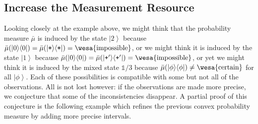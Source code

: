 \documentclass[12pt]{iopart}
\theoremstyle{remark}
\newcommand{\imposs}{{\mbox{\wesa{impossible}}}}
\newcommand{\necess}{{\mbox{\wesa{certain}}}}
\newcommand{\ket}[1]{{\left\vert{#1}\right\rangle}}
\newcommand{\op}[2]{\ensuremath{\left\vert{#1}\middle\rangle\middle\langle{#2}\right\vert}}
\newcommand{\proj}[1]{\op{#1}{#1}}
\newcommand{\ps}{\texttt{+}}
\begin{document}
\subsection{Increase the Measurement Resource}

Looking closely at the example above, we might think that the probability
measure $\bar{\mu}$ is induced by the state $\ket{2}$ because $\bar{\mu}(\proj{0})=\bar{\mu}(\proj{\ps})=\imposs$,
or we might think it is induced by the state $\ket{1}$ because $\bar{\mu}(\proj{0})=\bar{\mu}(\proj{\ps'})=\imposs$,
or yet we might think it is induced by the mixed state $\mathbb{1}/3$
because $\bar{\mu}(\proj{\phi})\ne\necess$ for all $\ket{\phi}$.
Each of these possibilities is compatible with some but not all of
the observations. All is not lost however: if the observations are
made more precise, we conjecture that some of the inconsistencies
disappear. A partial proof of this conjecture is the following example
which refines the previous convex probability measure by adding more
precise intervals.
\end{document}
